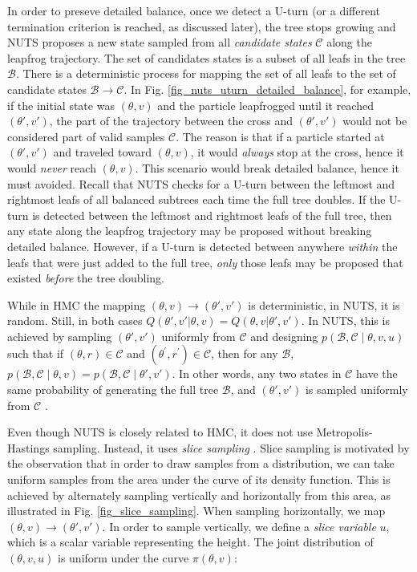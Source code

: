 \documentclass[12pt]{article}
\begin{document}
{In order to preseve detailed balance, once we detect a U-turn (or a different termination criterion is reached, as discussed later), the tree stops growing and NUTS proposes a new state sampled from all \textit{candidate states} $\mathcal{C}$ along the leapfrog trajectory. The set of candidates states is a subset of all leafs in the tree $\mathcal{B}$. There is a deterministic process for mapping the set of all leafs to the set of candidate states $\mathcal{B} \rightarrow \mathcal{C}$. In Fig. \ref{fig_nuts_uturn_detailed_balance}, for example, if the initial state was $(\theta, v)$ and the particle leapfrogged until it reached $(\theta', v')$, the part of the trajectory between the cross and $(\theta', v')$ would not be considered part of valid samples $\mathcal{C}$. The reason is that if a particle started at $(\theta', v')$ and traveled toward $(\theta, v)$, it would \textit{always} stop at the cross, hence it would \textit{never} reach $(\theta, v)$. This scenario would break detailed balance, hence it must avoided. Recall that NUTS checks for a U-turn between the leftmost and rightmost leafs of all balanced subtrees each time the full tree doubles. If the U-turn is detected between the leftmost and rightmost leafs of the full tree, then any state along the leapfrog trajectory may be proposed without breaking detailed balance. However, if a U-turn is detected between anywhere \textit{within} the leafs that were just added to the full tree, \textit{only} those leafs may be proposed that existed \textit{before} the tree doubling.

While in HMC the mapping $(\theta, v) \rightarrow (\theta', v')$ is deterministic, in NUTS, it is random. Still, in both cases $Q(\theta', v'|\theta, v) = Q(\theta, v|\theta', v')$. In NUTS, this is achieved by sampling $(\theta', v')$ uniformly from $\mathcal{C}$ and designing $p(\mathcal{B}, \mathcal{C} \mid \theta, v, u)$ such that if $(\theta, r) \in \mathcal{C}$ and $\left(\theta^{\prime}, r^{\prime}\right) \in \mathcal{C}$, then for any $\mathcal{B}$, $p(\mathcal{B}, \mathcal{C} \mid \theta, v)=p(\mathcal{B}, \mathcal{C} \mid \theta', v')$. In other words, any two states in $\mathcal{C}$ have the same probability of generating the full tree $\mathcal{B}$, and $(\theta', v')$ is sampled uniformly from $\mathcal{C}$ .

Even though NUTS is closely related to HMC, it does not use Metropolis-Hastings sampling. Instead, it uses \textit{slice sampling} \cite{slice_sampling}. Slice sampling is motivated by the observation that in order to draw samples from a distribution, we can take uniform samples from the area under the curve of its density function. This is achieved by alternately sampling vertically and horizontally from this area, as illustrated in Fig. \ref{fig_slice_sampling}. When sampling horizontally, we map $(\theta, v) \rightarrow (\theta', v')$. In order to sample vertically, we define a \textit{slice variable} $u$​, which is a scalar variable representing the height. The joint distribution of $(\theta, v, u)$ is uniform under the curve $\pi(\theta, v)$:

}
\end{document}

